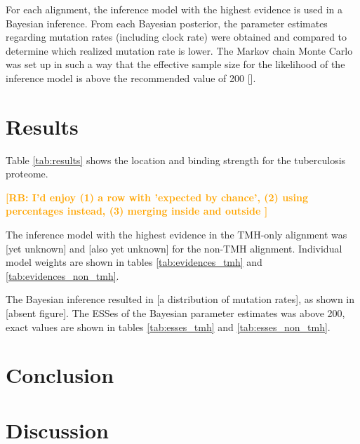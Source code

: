 \documentclass{article}
\newcommand{\richel}[1]{\textcolor{orange}{\textbf{[RB: #1]}}}
\begin{document}
For each alignment, the inference model with the highest evidence
is used in a Bayesian inference. From each Bayesian posterior,
the parameter estimates regarding mutation rates (including clock rate)
were obtained and compared to determine which realized mutation rate is lower.
The Markov chain Monte Carlo was set up in such a way that the effective sample
size for the likelihood of the inference model is above the recommended value
of 200 [\cite{bouckaert2014beast}].

\section{Results}

Table \ref{tab:results} shows the location and binding strength for the
tuberculosis proteome.


\richel{
  I'd enjoy 
  (1) a row with 'expected by chance', 
  (2) using percentages instead,
  (3) merging inside and outside
}

The inference model with the highest evidence in the
TMH-only alignment was [yet unknown] and [also yet unknown]
for the non-TMH alignment. Individual model weights are shown
in tables \ref{tab:evidences_tmh} 
and \ref{tab:evidences_non_tmh}.

The Bayesian inference resulted in [a distribution of mutation rates],
as shown in [absent figure].
The ESSes of the Bayesian parameter estimates was above 200, exact values
are shown in tables \ref{tab:esses_tmh} and \ref{tab:esses_non_tmh}.

\section{Conclusion}

\section{Discussion}
\end{document}
